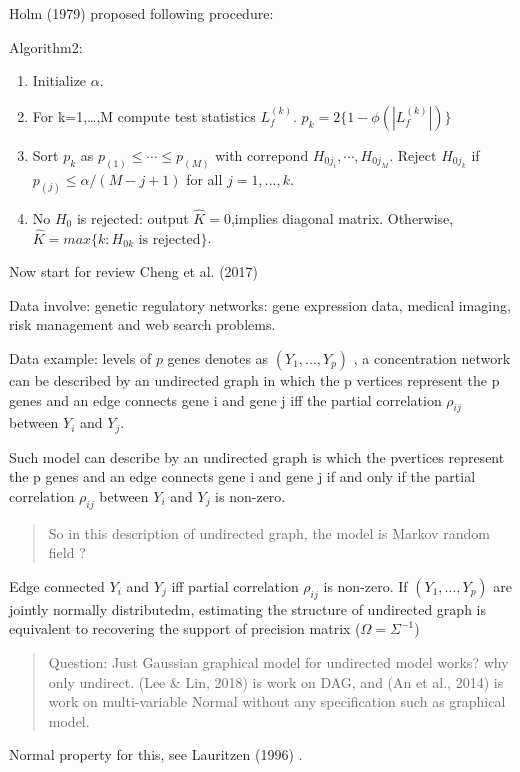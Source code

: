 \documentclass{beamer}
\begin{document}
\begin{frame}
Holm (1979) proposed following procedure:

Algorithm2:


\begin{enumerate}
\item
  Initialize \(\alpha\).
\item
  For k=1,\ldots{},M compute test statistics \(L_f^{(k)}\).
  \(p_k=2\{1-\phi(|L_f^{(k)}|)\}\)
\item
  Sort \(p_k\) as
  \(p _ { ( 1 ) } \leqslant \cdots \leqslant p _ { ( M ) }\) with
  correpond \(H_{0j_i},\cdots,H_{0j_M}\). Reject \(H_{0j_k}\) if
  \(p _ { ( j ) } \leqslant \alpha / ( M - j + 1 )\) for all
  \(j=1,...,k\).
\item
  No \(H_0\) is rejected: output \(\hat K=0\),implies diagonal matrix.
  Otherwise, \(\hat K=max\{k:H_{0k}\text{ is rejected}\}\).
\end{enumerate}
\end{frame}


\begin{frame}

Now start for review Cheng et al. (2017)

Data involve: genetic regulatory networks: gene expression data, medical
imaging, risk management and web search problems.

Data example: levels of \(p\) genes denotes as \((Y_1,...,Y_p)\) , a
concentration network can be described by an undirected graph in which
the p vertices represent the p genes and an edge connects gene i and
gene j iff the partial correlation \(\rho_{ij}\) between \(Y_i\) and
\(Y_j\).

Such model can describe by an undirected graph is which the pvertices
represent the p genes and an edge connects gene i and gene j if and only
if the partial correlation \(\rho_{ij}\) between \(Y_i\) and \(Y_j\) is
non-zero.
\begin{quote}
So in this description of undirected graph, the model is Markov random field ? 
\end{quote}
\end{frame}

\begin{frame}
Edge connected \(Y_i\) and \(Y_j\) iff partial correlation \(\rho_{ij}\)
is non-zero. If \(\left( Y _ { 1 } , \dots , Y _ { p } \right)\) are
jointly normally distributedm, estimating the structure of undirected
graph is equivalent to recovering the support of precision matrix
(\(\Omega=\Sigma^{-1}\))

\begin{quote}
Question: Just Gaussian graphical model for undirected model works? why
only undirect. (Lee \& Lin, 2018) is work on DAG, and (An et al., 2014)
is work on multi-variable Normal without any specification such as
graphical model.
\end{quote}

Normal property for this, see Lauritzen (1996) .
\end{frame}
\end{document}
